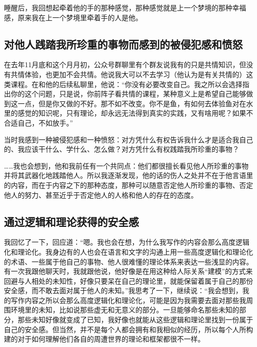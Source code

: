 睡醒后，我回想起牵着他的手的那种感觉，那种感觉就是上一个梦境的那种幸福感，原来我在上一个梦境里牵着手的人是他。



\subsection*{对他人践踏我所珍重的事物而感到的被侵犯感和愤怒}

在去年11月底和这个月月初，公众号群聊里有个群友说我有的只是共情知识，但没有共情体验，也更加不会共情。他说我大可以不去学习（他认为是有关共情的）这类课程。在和他的后续私聊里，他说：“你没有必要改变自己。我之所以会选择指出你的这个问题，只是说，你前阵子看共情的课程，某种意义上是希望自己能够做到这一点，但是你又做的不好。那不如不改变。你不是鱼，有如何去体验鱼对在水里的感觉的知识呢，只有理论，却永远无法得到真实的实践，又有啥用呢？如果不合适自己，不如放手。”

当时我感到一种被侵犯感和一种愤怒：对方凭什么有权告诉我什么才是适合我自己的、我应该干什么、学什么、怎么做？对方凭什么有权践踏我所珍重的事物？

……我也会想到，他和我前任有一个共同点：他们都很擅长看见他人所珍重的事物并将其武器化地践踏他人。所以我逐渐发现，他的话的伤人之处并不在于他言语里的内容，而在于内容之下的那种态度，那种可以随意否定他人所珍重的事物、否定他人的努力、甚至近乎于否定他人的人格和他人的存在的态度。



\subsection*{通过逻辑和理论获得的安全感}

我回忆了一下，回应道：“嗯。我也会在想，为什么我写作的内容会那么高度逻辑化和理论化。我身边有的人也会在语言和文字的沟通上用一些高度逻辑化和理论化的术语、一些属于他自己的事物、他人很难懂的理论体系来表达一些浅显的内容。有一次我跟他聊天时，我就跟他说，他好像是在用这种给人际关系“建模”的方式来回避与人相处的未知性，好像只要呆在自己的理论里，就能保留着属于自己的那份安全感，而不敢去面对属于他人的未知。”我思考了一下，继续说：“我会想到，我的写作内容之所以会那么高度逻辑化和理论化，可能是因为我需要去面对那些我周围环境里的未知，比如说那些虚无和无意义的部分。一旦能够命名那些未知的部分，那些未知好像就变成了已知，我好像也就能从这些逻辑和理论里找到一份属于自己的安全感。但当然，并不是每个人都会拥有和我相似的经历，所以每个人所构建的对于如何理解他们各自的周遭世界的理论和框架都很不一样。

